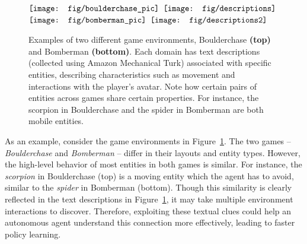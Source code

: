 \begin{figure}[!t]
\minipage{\linewidth}
$\vcenter{\hbox{\texttt{[image: fig/boulderchase\_pic]}}}$ \hfill
$\vcenter{\hbox{\texttt{[image: fig/descriptions]}}}$
\endminipage\\

\minipage{\linewidth}
\vspace{0.3cm}
$\vcenter{\hbox{\texttt{[image: fig/bomberman\_pic]}}}$\hfill
$\vcenter{\hbox{\texttt{[image: fig/descriptions2]}}}$
\endminipage 

\caption{Examples of two different game environments, Boulderchase \textbf{(top)} and Bomberman \textbf{(bottom)}. Each domain has text descriptions (collected using Amazon Mechanical Turk) associated with specific entities, describing characteristics such as movement and interactions with the player's avatar. Note how certain pairs of entities across games share certain properties. For instance, the scorpion in Boulderchase and the spider in Bomberman are both mobile entities.}

	\label{fig:example}
\end{figure}

As an example, consider the game environments in Figure~\ref{fig:example}. The two games -- \emph{Boulderchase} and \emph{Bomberman} 
--  differ in their layouts and entity types. However, the high-level behavior of most entities in both games is similar. For instance, the \emph{scorpion} in Boulderchase (top) is a moving entity which the agent has to avoid, similar to the \emph{spider} in Bomberman (bottom). Though this similarity is clearly reflected in the text descriptions in Figure~\ref{fig:example}, it may take multiple environment interactions to discover.  Therefore, exploiting these textual clues could help an autonomous agent understand this connection more effectively, leading to faster policy learning.







